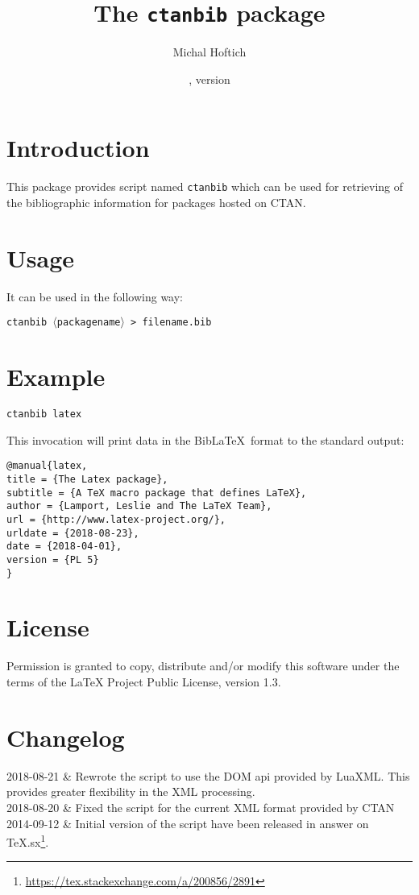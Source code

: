 \documentclass{ltxdoc}
\title{The \texttt{ctanbib} package}
\author{Michal Hoftich}
\date{\gitdate, version \gitversion}
\makeatletter
\newcommand\package[1]{\texttt{#1}}
\newenvironment{changelog}{\longtable{@{} l p{30em}}}{\endlongtable}
\newcommand\change[2]{#1 & #2\\}
\makeatother
\begin{document}
\maketitle

\section{Introduction}
This package provides script named \package{ctanbib} which can be used for retrieving of the bibliographic information for packages hosted on CTAN.

\section{Usage}


It can be used in the following way:


\noindent\package{ctanbib $\langle$packagename$\rangle$ > filename.bib}

\section{Example}

\begin{verbatim}
ctanbib latex  
\end{verbatim}

This invocation will print data in the Bib\LaTeX\ format to the standard output:

\begin{verbatim}
@manual{latex,
title = {The Latex package},
subtitle = {A TeX macro package that defines LaTeX},
author = {Lamport, Leslie and The LaTeX Team},
url = {http://www.latex-project.org/},
urldate = {2018-08-23}, 
date = {2018-04-01},
version = {PL 5}
}
\end{verbatim}

\section{License}

Permission is granted to copy, distribute and/or modify this software
under the terms of the LaTeX Project Public License, version 1.3.

\section{Changelog}

\begin{changelog}
  \change{2018-08-21}{Rewrote the script to use the DOM api provided by LuaXML. This provides greater flexibility in the XML processing.}
  \change{2018-08-20}{Fixed the script for the current XML format provided by CTAN}
  \change{2014-09-12}{Initial version of the script have been released in answer on TeX.sx\footnote{\url{https://tex.stackexchange.com/a/200856/2891}}.}
\end{changelog}
\end{document}
